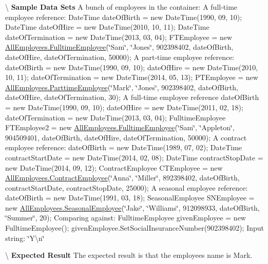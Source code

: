 \textbackslash{} {\bfseries  Sample Data Sets} A bunch of employees in the container\+: A full-\/time employee reference\+: Date\+Time date\+Of\+Birth = new Date\+Time(1990, 09, 10); Date\+Time date\+Of\+Hire = new Date\+Time(2010, 10, 11); Date\+Time date\+Of\+Termination = new Date\+Time(2013, 03, 04); F\+T\+Employee = new \hyperlink{class_all_employees_1_1_fulltime_employee}{All\+Employees.\+Fulltime\+Employee}(\char`\"{}\+Sam\char`\"{}, \char`\"{}\+Jones\char`\"{}, 902398402, date\+Of\+Birth, date\+Of\+Hire, date\+Of\+Termination, 50000); A part-\/time employee reference\+: date\+Of\+Birth = new Date\+Time(1990, 09, 10); date\+Of\+Hire = new Date\+Time(2010, 10, 11); date\+Of\+Termination = new Date\+Time(2014, 05, 13); P\+T\+Employee = new \hyperlink{class_all_employees_1_1_parttime_employee}{All\+Employees.\+Parttime\+Employee}(\char`\"{}\+Mark\char`\"{}, \char`\"{}\+Jones\char`\"{}, 902398402, date\+Of\+Birth, date\+Of\+Hire, date\+Of\+Termination, 30); A full-\/time employee reference date\+Of\+Birth = new Date\+Time(1990, 09, 10); date\+Of\+Hire = new Date\+Time(2011, 02, 18); date\+Of\+Termination = new Date\+Time(2013, 03, 04); Fulltime\+Employee F\+T\+Employee2 = new \hyperlink{class_all_employees_1_1_fulltime_employee}{All\+Employees.\+Fulltime\+Employee}(\char`\"{}\+Sam\char`\"{}, \char`\"{}\+Appleton\char`\"{}, 904509401, date\+Of\+Birth, date\+Of\+Hire, date\+Of\+Termination, 50000); A contract employee reference\+: date\+Of\+Birth = new Date\+Time(1989, 07, 02); Date\+Time contract\+Start\+Date = new Date\+Time(2014, 02, 08); Date\+Time contract\+Stop\+Date = new Date\+Time(2014, 09, 12); Contract\+Employee C\+T\+Employee = new \hyperlink{class_all_employees_1_1_contract_employee}{All\+Employees.\+Contract\+Employee}(\char`\"{}\+Anna\char`\"{}, \char`\"{}\+Miller\char`\"{}, 892398402, date\+Of\+Birth, contract\+Start\+Date, contract\+Stop\+Date, 25000); A seasonal employee reference\+: date\+Of\+Birth = new Date\+Time(1991, 03, 18); Seasonal\+Employee S\+N\+Employee = new \hyperlink{class_all_employees_1_1_seasonal_employee}{All\+Employees.\+Seasonal\+Employee}(\char`\"{}\+Jake\char`\"{}, \char`\"{}\+Williams\char`\"{}, 912098933, date\+Of\+Birth, \char`\"{}\+Summer\char`\"{}, 20); Comparing against\+: Fulltime\+Employee given\+Employee = new Fulltime\+Employee(); given\+Employee.\+Set\+Social\+Insurance\+Number(902398402); Input string\+: \char`\"{}\+Y\textbackslash{}n\char`\"{}

\textbackslash{} {\bfseries  Expected Result} The expected result is that the employee\textquotesingle{}s name is Mark.

